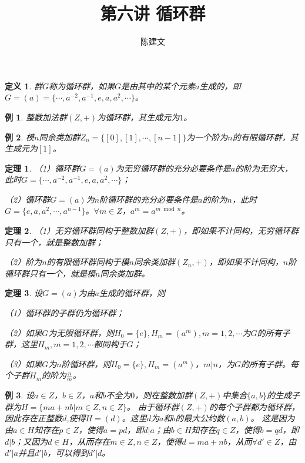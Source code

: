 \documentclass{article}
\newtheorem{Def}{定义}
\newtheorem{Thm}{定理}
\newtheorem*{Example}{例}
\begin{document}
\begin{CJK*}{UTF8}{gbsn}
  \title{第六讲 循环群}
  \author{陈建文}
  \maketitle
  
\begin{Def}
  群$G$称为循环群，如果$G$是由其中的某个元素$a$生成的，即$G=(a)=\{\cdots,a^{-2},a^{-1},e,a,a^2,\cdots\}$。
\end{Def}

\begin{Example}
  整数加法群$(Z,+)$为循环群，其生成元为$1$。
\end{Example}

\begin{Example}
  模$n$同余类加群$Z_n=\{[0],[1],\cdots,[n-1]\}$为一个阶为$n$的有限循环群，其生成元为$[1]$。
\end{Example}

\begin{Thm}
  （1）循环群$G=(a)$为无穷循环群的充分必要条件是$a$的阶为无穷大，此时$G=\{\cdots,a^{-2},a^{-1},e,a,a^2,\cdots\}$；
  
  （2）循环群$G=(a)$为$n$阶循环群的充分必要条件是$a$的阶为$n$，此时$G=\{e,a,a^2,\cdots,a^{n-1}\}$。$\forall m\in Z$，$a^m=a^{m\bmod n}$。
\end{Thm}

\begin{Thm}
  （1）无穷循环群同构于整数加群$(Z,+)$，即如果不计同构，无穷循环群只有一个，就是整数加群；
  
  （2）阶为$n$的有限循环群同构于模$n$同余类加群$(Z_n,+)$，即如果不计同构，$n$阶循环群只有一个，就是模$n$同余类加群。
\end{Thm}

\begin{Thm}
  设$G=(a)$为由$a$生成的循环群，则

  （1）循环群的子群仍为循环群；

  （2）如果$G$为无限循环群，则$H_0=\{e\},H_m=(a^m),m=1,2,\cdots$为$G$的所有子群，这里$H_m,m=1,2,\cdots$都同构于$G$；

  （3）如果$G$为$n$阶循环群，则$H_0=\{e\},H_m=(a^m)$，$m|n$，为$G$的所有子群。每个子群$H_m$的阶为$\frac{n}{m}$。
\end{Thm}

\begin{Example}
  设$a\in Z$，$b\in Z$，$a$和$b$不全为$0$，则在整数加群$(Z,+)$中集合$\{a,b\}$的生成子群为$H=\{ma+nb|m\in Z,n\in Z\}$。
  由于循环群$(Z,+)$的每个子群都为循环群，因此存在正整数$d$,使得$H=(d)$。这里$d$为$a$和$b$的最大公约数$(a,b)$。
  这是因为由$a\in H$知存在$p\in Z$，使得$a=pd$，即$d|a$；由$b\in H$知存在$q\in Z$，使得$b=qd$，即$d|b$；又因为$d\in H$，从而存在$m\in Z,n\in Z$，使得$d=ma+nb$，从而$\forall d'\in Z$，由$d'|a$并且$d'|b$，可以得到$d'|d$。
\end{Example}


\end{CJK*}
\end{document}
